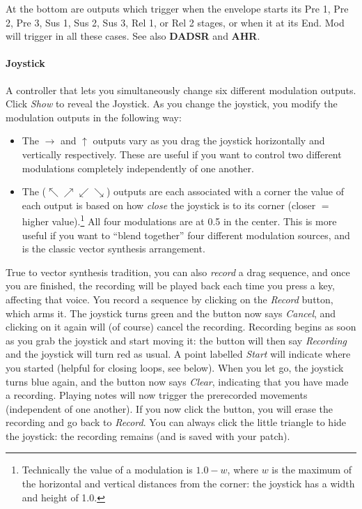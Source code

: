 \documentclass{article}
\begin{document}
At the bottom are outputs which trigger when the envelope starts its Pre 1, Pre 2,  Pre 3, Sus 1, Sus 2, Sus 3, Rel 1, or Rel 2 stages, or when it at its End.  Mod will trigger in all these cases.  See also {\bf DADSR} and {\bf AHR}.

\paragraph{Joystick}  A controller that lets you simultaneously change six different modulation outputs.   Click {\it Show} to reveal the Joystick.  As you change the joystick, you modify the modulation outputs in the following way:

\begin{itemize}
\item The \(\rightarrow\) and \(\uparrow\) outputs vary as you drag the joystick horizontally and vertically respectively.  These are useful if you want to control two different modulations completely independently of one another.
\item The  (\(\nwarrow \nearrow \swarrow \searrow\)) outputs are each associated with a corner the value of each output is based on how {\it close} the joystick is to its corner (closer \(=\) higher value).\footnote{Technically the value of a modulation is \(1.0 - w\), where \(w\) is the maximum of the horizontal and vertical distances from the corner: the joystick has a width and height of 1.0.}   All four modulations are at 0.5 in the center.  This is more useful if you want to ``blend together'' four different modulation sources, and is the classic vector synthesis arrangement.
\end{itemize}

True to vector synthesis tradition, you can also {\it record} a drag sequence, and once you are finished, the recording will be played back each time you press a key, affecting that voice.  You record a sequence by clicking on the {\it Record} button, which arms it.  The joystick turns green and the button now says {\it Cancel}, and clicking on it again will (of course) cancel the recording.  Recording begins as soon as you grab the joystick and start moving it: the button will then say {\it Recording} and the joystick will turn red as usual.  A point labelled {\it Start} will indicate where you started (helpful for closing loops, see below).  When you let go, the joystick turns blue again, and the button now says {\it Clear}, indicating that you have made a recording.  Playing notes will now trigger the prerecorded movements (independent of one another).  If you now click the button, you will erase the recording and go back to {\it Record}.   You can always click the little triangle to hide the joystick: the recording remains (and is saved with your patch).
\end{document}
